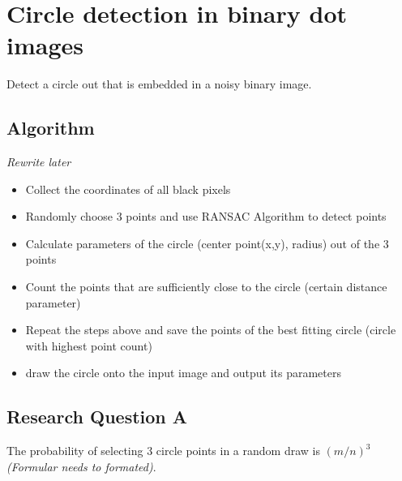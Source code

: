\chapter{Circle detection in binary dot images}


Detect a circle out that is embedded in a noisy binary image.

\section{Algorithm}
{\it Rewrite later}

\begin{itemize}
	\item Collect the coordinates of all black pixels
	\item Randomly choose 3 points and use RANSAC Algorithm to detect points
	\item Calculate parameters of the circle (center point(x,y), radius) out of the 3 points
	\item Count the points that are sufficiently close to the circle (certain distance parameter)
	\item Repeat the steps above and save the points of the best fitting circle (circle with highest point count)
	\item draw the circle onto the input image and output its parameters
\end{itemize}


\section{Research Question A}
The probability of selecting 3 circle points in a random draw is $(m/n)^3$ {\it (Formular needs to formated)}.


